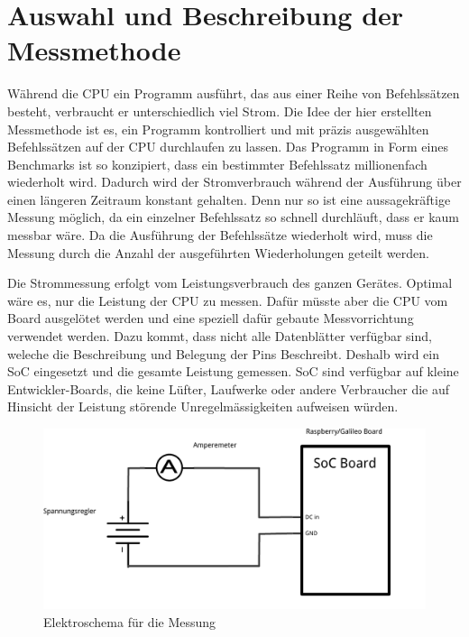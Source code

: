 \section{Auswahl und Beschreibung der Messmethode}
\label{chap:auswahl_beschreibung_methode}

Während die CPU ein Programm ausführt, das aus einer Reihe von Befehlssätzen besteht, verbraucht er unterschiedlich viel Strom. Die Idee der hier erstellten Messmethode ist es, ein Programm kontrolliert und mit präzis ausgewählten Befehlssätzen auf der CPU durchlaufen zu lassen. Das Programm in Form eines Benchmarks ist so konzipiert, dass ein bestimmter Befehlssatz millionenfach wiederholt wird. Dadurch wird der Stromverbrauch während der Ausführung über einen längeren Zeitraum konstant gehalten. Denn nur so ist eine aussagekräftige Messung möglich, da ein einzelner Befehlssatz so schnell durchläuft, dass er kaum messbar wäre. Da die Ausführung der Befehlssätze wiederholt wird, muss die Messung durch die Anzahl der ausgeführten Wiederholungen geteilt werden.
\par
Die Strommessung erfolgt vom Leistungsverbrauch des ganzen Gerätes. Optimal wäre es, nur die Leistung der CPU zu messen. Dafür müsste aber die CPU vom Board ausgelötet werden und eine speziell dafür gebaute Messvorrichtung verwendet werden. Dazu kommt, dass nicht alle Datenblätter verfügbar sind, weleche die Beschreibung und Belegung der Pins Beschreibt. Deshalb wird ein SoC eingesetzt und die gesamte Leistung gemessen. SoC sind verfügbar auf kleine Entwickler-Boards, die keine Lüfter, Laufwerke oder andere Verbraucher die  auf Hinsicht der Leistung störende Unregelmässigkeiten aufweisen würden.



\begin{figure}
\centering
\includegraphics[scale=0.5]{images/schema.pdf}
\caption{Elektroschema für die Messung}
\label{fig:Elektroschema}
\end{figure}



